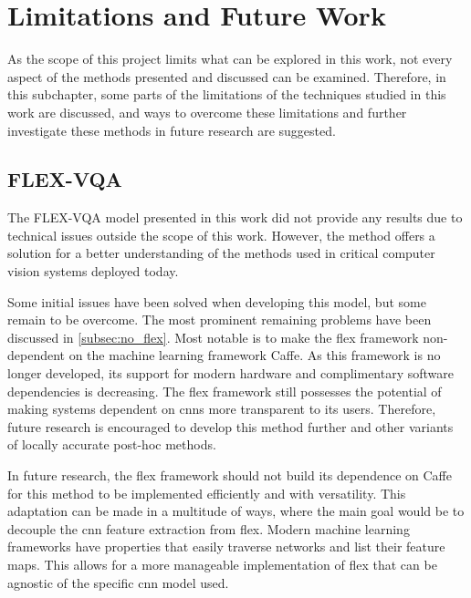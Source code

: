 \section{Limitations and Future Work}
\label{sec:5_3_future_work}  %

\begin{comment}
    Your thesis will NOT answer everything. Still, it is important that you here show that you are aware of that and list various things that could be done to follow up on your work. What would be the next steps? Next experiments? Maybe link this up against section 1.3 - scope and limitations.
\end{comment}

As the scope of this project limits what can be explored in this work, not every aspect of the methods presented and discussed can be examined. Therefore, in this subchapter, some parts of the limitations of the techniques studied in this work are discussed, and ways to overcome these limitations and further investigate these methods in future research are suggested.

\subsection{FLEX-VQA}
    The FLEX-VQA model presented in this work did not provide any results due to technical issues outside the scope of this work. However, the method offers a solution for a better understanding of the methods used in critical computer vision systems deployed today.

    Some initial issues have been solved when developing this model, but some remain to be overcome. The most prominent remaining problems have been discussed in  \autoref{subsec:no_flex}. Most notable is to make the \gls{flex} framework non-dependent on the machine learning framework Caffe. As this framework is no longer developed, its support for modern hardware and complimentary software dependencies is decreasing. The \gls{flex} framework still possesses the potential of making systems dependent on \glspl{cnn} more transparent to its users. Therefore, future research is encouraged to develop this method further and other variants of locally accurate post-hoc methods. 

    In future research, the \gls{flex} framework should not build its dependence on Caffe for this method to be implemented efficiently and with versatility.
    This adaptation can be made in a multitude of ways, where the main goal would be to decouple the \gls{cnn} feature extraction from \gls{flex}. Modern machine learning frameworks have properties that easily traverse networks and list their feature maps. This allows for a more manageable implementation of \gls{flex} that can be agnostic of the specific \gls{cnn} model used. 


